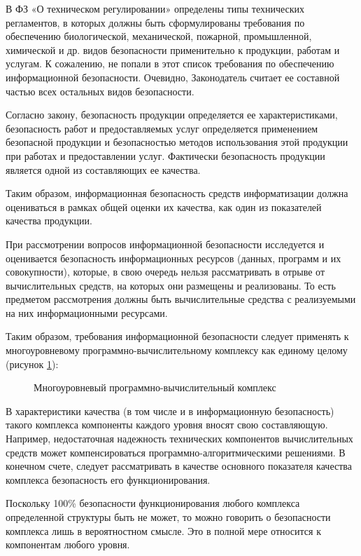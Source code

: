 В ФЗ «О техническом регулировании» определены типы технических регламентов, в которых должны быть сформулированы требования по обеспечению биологической, механической, пожарной, промышленной, химической и др. видов безопасности применительно к продукции, работам и услугам. К сожалению, не попали в этот список требования по обеспечению информационной безопасности. Очевидно, Законодатель считает ее составной частью всех остальных видов безопасности.

Согласно закону, безопасность продукции определяется ее характеристиками, безопасность работ и предоставляемых услуг определяется применением безопасной продукции и безопасностью методов использования этой продукции при работах и предоставлении услуг. Фактически безопасность продукции является одной из составляющих ее качества.

Таким образом, информационная безопасность средств информатизации должна оцениваться в рамках общей оценки их качества, как один из показателей качества продукции.

При рассмотрении вопросов информационной безопасности исследуется и оценивается безопасность информационных ресурсов (данных, программ и их совокупности), которые, в свою очередь нельзя рассматривать в отрыве от вычислительных средств, на которых они размещены и реализованы. То есть предметом рассмотрения должны быть вычислительные средства с реализуемыми на них информационными ресурсами.

Таким образом, требования информационной безопасности следует применять к многоуровневому программно-вычислительному комплексу как единому целому (рисунок \ref{mnogour_pvk:pon1}):

\begin{figure}[h!]
\caption{Многоуровневый программно-вычислительный комплекс}
\label{mnogour_pvk:pon1}
\end{figure}

В характеристики качества (в том числе и в информационную безопасность) такого комплекса компоненты каждого уровня вносят свою составляющую. Например, недостаточная надежность технических компонентов вычислительных средств может компенсироваться программно-алгоритмическими решениями. В конечном счете, следует рассматривать в качестве основного показателя качества комплекса безопасность его функционирования.

Поскольку 100\% безопасности функционирования любого комплекса определенной структуры быть не может, то можно говорить о безопасности комплекса лишь в вероятностном смысле. Это в полной мере относится к компонентам любого уровня.

